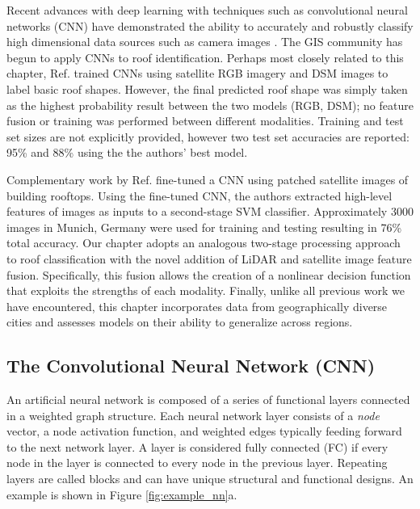Recent advances with deep learning with techniques such as convolutional neural networks (CNN) have demonstrated the ability to accurately and robustly classify high dimensional data sources such as camera images \cite{schmidhuber_deep_2015}. The GIS community has begun to apply CNNs to roof identification.  Perhaps most closely related to this chapter, Ref. \cite{alidoost_knowledge_2016} trained CNNs using satellite \ac{RGB} imagery and \ac{DSM} images to label basic roof shapes.  However, the final predicted roof shape was simply taken as the highest probability result between the two models (RGB, DSM); no feature fusion or training was performed between different modalities.  Training and test set sizes are not explicitly provided, however two test set accuracies are reported: 95\% and 88\% using the the authors' best model.

Complementary work by Ref. \cite{partovi_roof_2017} fine-tuned a \ac{CNN} using patched satellite images of building rooftops.  Using the fine-tuned \ac{CNN}, the authors extracted high-level features of images as inputs to a second-stage SVM classifier. Approximately 3000 images in Munich, Germany were used for training and testing resulting in 76\% total accuracy. Our chapter adopts an analogous two-stage processing approach to roof classification with the novel addition of LiDAR and satellite image feature fusion. Specifically, this fusion allows the creation of a nonlinear decision function that exploits the strengths of each modality. Finally, unlike all previous work we have encountered, this chapter incorporates data from geographically diverse cities and assesses models on their ability to generalize across regions.

\subsection{The Convolutional Neural Network (CNN)}


An artificial neural network is composed of a series of functional layers connected in a weighted graph structure. 
Each neural network layer consists of a \emph{node} vector, a node activation function, and weighted edges typically feeding forward to the next network layer. A layer is considered fully connected (FC) if every node in the layer is connected to every node in the previous layer.  Repeating layers are called blocks and can have unique structural and functional designs. An example is shown in Figure \ref{fig:example_nn}a.
\vspace{-12pt}


